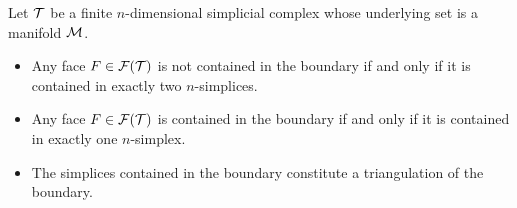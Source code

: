 \documentclass[10pt,a4paper]{article}
\begin{document}
\begin{lemma}\label{lemma:boundarysimplices}
    Let ${\mathcal T}$ be a finite $n$-dimensional simplicial complex whose underlying set is a manifold ${\mathcal M}$. 
    \begin{itemize}
        \item Any face $F \in {\mathcal F}({\mathcal T})$ is not contained in the boundary if and only if it is contained in exactly two $n$-simplices.
        \item Any face $F \in {\mathcal F}({\mathcal T})$ is contained in the boundary if and only if it is contained in exactly one $n$-simplex.
        \item The simplices contained in the boundary constitute a triangulation of the boundary.
    \end{itemize}
\end{lemma}
\end{document}
